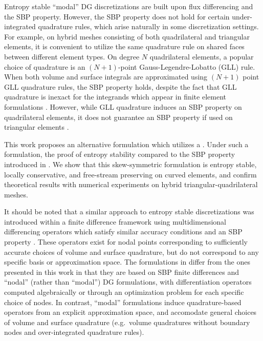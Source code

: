\documentclass{svjour3}                     %
\renewcommand{\note}[1]{{\color{blue}{#1}}}
\begin{document}
Entropy stable ``modal'' DG discretizations \cite{chan2017discretely, chan2018discretely} are built upon flux differencing and the SBP property.  However, the SBP property does not hold for certain under-integrated quadrature rules, which arise naturally in some discretization settings.  For example, on hybrid meshes consisting of both quadrilateral and triangular elements, it is convenient to utilize the same quadrature rule on shared faces between different element types.  On degree $N$ quadrilateral elements, a popular choice of quadrature is an $(N+1)$-point Gauss-Legendre-Lobatto (GLL) rule.  When both volume and surface integrals are approximated using $(N+1)$ point GLL quadrature rules, the SBP property holds, despite the fact that GLL quadrature is inexact for the integrands which appear in finite element formulations \cite{fisher2013high}.  However, while GLL quadrature induces an SBP property on quadrilateral elements, it does not guarantee an SBP property if used on triangular elements \cite{chan2017discretely}.  

This work proposes an alternative formulation which utilizes a \note{skew-symmetric construction of the SBP operator which satisfies the SBP property by construction}.  Under such a formulation, the proof of entropy stability \note{holds under weaker quadrature rules} compared to the SBP property introduced in \cite{chan2017discretely, chan2018discretely}.  We show that this skew-symmetric formulation is entropy stable, locally conservative, and free-stream preserving on curved elements, and confirm theoretical results with numerical experiments on hybrid triangular-quadrilateral meshes.  

It should be noted that a similar approach to entropy stable discretizations was introduced within a finite difference framework \cite{chen2017entropy, crean2018entropy} using multidimensional differencing operators which satisfy similar accuracy conditions and an SBP property \cite{hicken2016multidimensional}.  These operators exist for nodal points corresponding to sufficiently accurate choices of volume and surface quadrature, but do not correspond to any specific basis or approximation space.  The formulations in \cite{chen2017entropy, crean2018entropy} differ from the ones presented in this work in that they are based on SBP finite differences and ``nodal'' (rather than ``modal'') DG formulations, with differentiation operators computed algebraically or through an optimization problem for each specific choice of nodes.  In contrast, ``modal'' formulations induce quadrature-based operators from an explicit approximation space, and accomodate general choices of volume and surface quadrature (e.g.\ volume quadratures without boundary nodes and over-integrated quadrature rules).  
\end{document}
